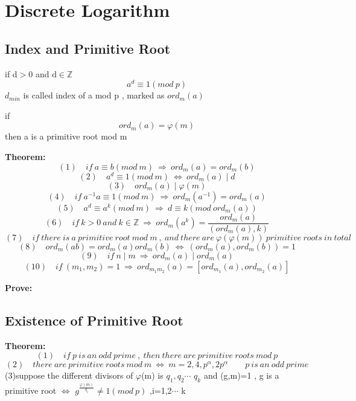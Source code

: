 \documentclass{ctexart}
\begin{document}
\vspace{12 pt}
\section{Discrete Logarithm}
\subsection{Index and Primitive Root}
if d$>0$ and d\(\in\)\(\mathbb{Z}\)
\[a^{d}\equiv 1(mod\ p)\]
\(d_{min}\) is called index of a mod p , marked as \(ord_m(a)\)

\vspace{12 pt}
if 
\[ord_m(a)=\varphi (m)\]
then a is a primitive root mod m

\vspace{12 pt}
\textbf{Theorem:}
\[(1)\quad if\ a\equiv b(mod\ m) \ \Rightarrow \ ord_m(a)=ord_m(b)\]
\[(2)\quad a^d\equiv 1(mod\ m) \ \Leftrightarrow \ ord_m(a)\mid d\]
\[(3)\quad ord_m(a)\mid \varphi (m)\]
\[(4)\quad if \ a^{-1}a\equiv 1(mod\ m) \ \Rightarrow \ ord_m(a^{-1})=ord_m(a)\]
\[(5)\quad a^d\equiv a^k(mod\ m) \ \Rightarrow \ d\equiv k(mod\ ord_m(a))\]
\[(6)\quad if\ k>0\ and\ k\in \mathbb{Z}\ \Rightarrow \ ord_m(a^k)=\frac{ord_m(a)}{(ord_m(a),k)}\]
\[(7)\quad if\ there\ is\ a\ primitive\ root\ mod\ m\ ,\ and\ there\ are\ \varphi(\varphi(m))\ primitive\ roots\ in\ total\]
\[(8)\quad ord_m(ab)=ord_m(a)ord_m(b) \ \Leftrightarrow \ (ord_m(a),ord_m(b))=1\]
\[(9)\quad if\ n\mid m\ \Rightarrow \ ord_m(a)\mid ord_m(a)\]
\[(10)\quad if\ (m_1,m_2)=1 \ \Rightarrow \ ord_{m_1m_2}(a)=[ord_{m_1}(a),ord_{m_2}(a)]\]

\vspace{12 pt}
\textbf{Prove:}



\vspace{12 pt}
\subsection{Existence of Primitive Root}
\textbf{Theorem:}
\[(1)\quad if\ p\ is\ an\ odd\ prime\ ,\ then\ there\ are\ primitive\ roots\ mod\ p\]
\[(2)\quad there\ are\ primitive\ roots\ mod\ m\ \Leftrightarrow \ m=2,4,p^{\alpha},2p^{\alpha}\qquad p\ is\ an\ odd\ prime\]
(3)\quad suppose the different divisors of \(\varphi\)(m) is \( q_1,q_2\)\(\cdots\) \(q_k\) and (g,m)=1 ,
 g is a primitive root \(\Leftrightarrow\) \(g^{\frac{\varphi(m)}{q_i}}\neq 1(mod\ p)\) ,\quad i=1,2\(\cdots\) k
  
\end{document}
